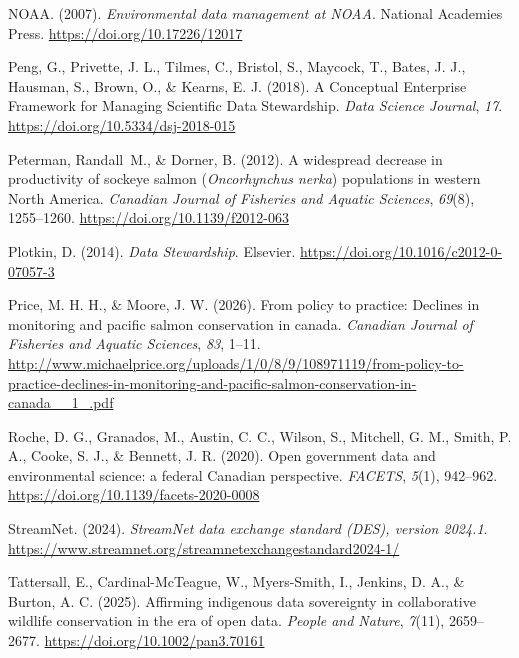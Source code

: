 \documentclass[
  letterpaper,
  DIV=11,
  numbers=noendperiod]{scrartcl}
\newlength{\cslhangindent}
\newenvironment{CSLReferences}[2] %
 {\begin{list}{}{%
  \setlength{\itemindent}{0pt}
  \setlength{\leftmargin}{0pt}
  \setlength{\parsep}{0pt}
  \ifodd #1
   \setlength{\leftmargin}{\cslhangindent}
   \setlength{\itemindent}{-1\cslhangindent}
  \fi
  \setlength{\itemsep}{#2\baselineskip}}}
 {\end{list}}
\begin{document}
\begin{CSLReferences}{1}{0}
NOAA. (2007). \emph{Environmental data management at NOAA}. National
Academies Press. \url{https://doi.org/10.17226/12017}

Peng, G., Privette, J. L., Tilmes, C., Bristol, S., Maycock, T., Bates,
J. J., Hausman, S., Brown, O., \& Kearns, E. J. (2018). A Conceptual
Enterprise Framework for Managing Scientific Data Stewardship.
\emph{Data Science Journal}, \emph{17}.
\url{https://doi.org/10.5334/dsj-2018-015}

Peterman, Randall~M., \& Dorner, B. (2012). A widespread decrease in
productivity of sockeye salmon ({\emph{Oncorhynchus nerka}}) populations
in western North America. \emph{Canadian Journal of Fisheries and
Aquatic Sciences}, \emph{69}(8), 1255--1260.
\url{https://doi.org/10.1139/f2012-063}

Plotkin, D. (2014). \emph{Data Stewardship}. Elsevier.
\url{https://doi.org/10.1016/c2012-0-07057-3}

Price, M. H. H., \& Moore, J. W. (2026). From policy to practice:
Declines in monitoring and pacific salmon conservation in canada.
\emph{Canadian Journal of Fisheries and Aquatic Sciences}, \emph{83},
1--11.
\url{http://www.michaelprice.org/uploads/1/0/8/9/108971119/from-policy-to-practice-declines-in-monitoring-and-pacific-salmon-conservation-in-canada__1_.pdf}

Roche, D. G., Granados, M., Austin, C. C., Wilson, S., Mitchell, G. M.,
Smith, P. A., Cooke, S. J., \& Bennett, J. R. (2020). Open government
data and environmental science: a federal Canadian perspective.
\emph{FACETS}, \emph{5}(1), 942--962.
\url{https://doi.org/10.1139/facets-2020-0008}

StreamNet. (2024). \emph{StreamNet data exchange standard (DES), version
2024.1}.
\url{https://www.streamnet.org/streamnetexchangestandard2024-1/}

Tattersall, E., Cardinal-McTeague, W., Myers-Smith, I., Jenkins, D. A.,
\& Burton, A. C. (2025). Affirming indigenous data sovereignty in
collaborative wildlife conservation in the era of open data.
\emph{People and Nature}, \emph{7}(11), 2659--2677.
\url{https://doi.org/10.1002/pan3.70161}


\end{CSLReferences}
\end{document}
